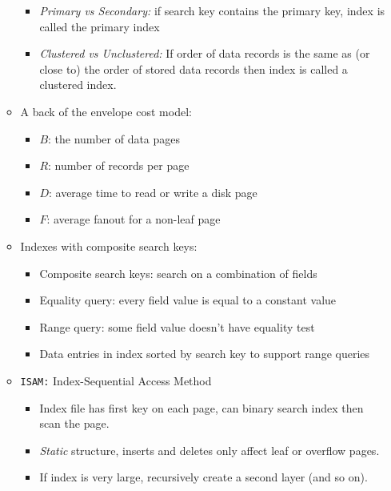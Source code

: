 \documentclass[landscape,8pt]{extarticle}
\newcommand{\code}{\lstinline}
\begin{document}
\begin{multicols}{4}
\begin{itemize}
\begin{itemize}
                        \begin{itemize}
                            \item \emph{Primary vs Secondary:} if search key contains the primary key, index is called the primary index
                            \item \emph{Clustered vs Unclustered:} If order of data records is the same as (or close to) the order of stored data records then index is called a clustered index.
                        \end{itemize}
                  \item A back of the envelope cost model:
                        \begin{itemize}
                            \item $B$: the number of data pages
                            \item $R$: number of records per page
                            \item $D$: average time to read or write a disk page
                            \item $F$: average fanout for a non-leaf page
                        \end{itemize}
                  \item Indexes with composite search keys:
                        \begin{itemize}
                            \item Composite search keys: search on a combination of fields
                            \item Equality query: every field value is equal to a constant value
                            \item Range query: some field value doesn't have equality test
                            \item Data entries in index sorted by search key to support range queries
                        \end{itemize}
                  \item \code{ISAM:} Index-Sequential Access Method
                        \begin{itemize}
                            \item Index file has first key on each page, can binary search index then scan the page.
                            \item \emph{Static} structure, inserts and deletes only affect leaf or overflow pages.
                            \item If index is very large, recursively create a second layer (and so on).

\end{itemize}
\end{itemize}
\end{itemize}
\end{multicols}
\end{document}
